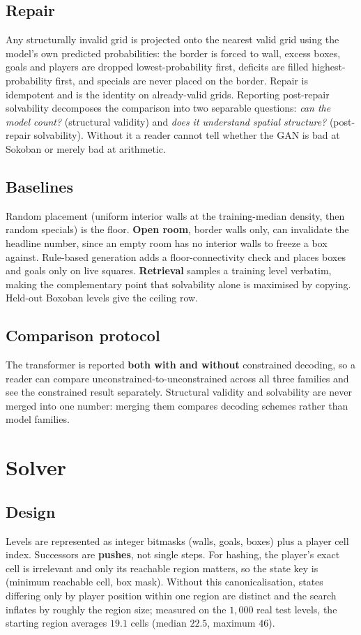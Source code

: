 \documentclass[conference]{IEEEtran}
\begin{document}
\subsection{Repair}
Any structurally invalid grid is projected onto the nearest valid grid using the
model's own predicted probabilities: the border is forced to wall, excess boxes,
goals and players are dropped lowest-probability first, deficits are filled
highest-probability first, and specials are never placed on the border. Repair is
idempotent and is the identity on already-valid grids. Reporting post-repair
solvability decomposes the comparison into two separable questions: \emph{can the
model count?} (structural validity) and \emph{does it understand spatial
structure?} (post-repair solvability). Without it a reader cannot tell whether
the GAN is bad at Sokoban or merely bad at arithmetic.

\subsection{Baselines}
Random placement (uniform interior walls at the training-median density, then
random specials) is the floor. \textbf{Open room}, border walls only, can
invalidate the headline number, since an empty room has no interior walls to
freeze a box against. Rule-based generation adds a floor-connectivity check and
places boxes and goals only on live squares. \textbf{Retrieval} samples a
training level verbatim, making the complementary point that solvability alone is
maximised by copying. Held-out Boxoban levels give the ceiling row.

\subsection{Comparison protocol}
The transformer is reported \textbf{both with and without} constrained decoding,
so a reader can compare unconstrained-to-unconstrained across all three
families and see the constrained result separately. Structural validity and
solvability are never merged into one number: merging them compares decoding
schemes rather than model families.

\section{Solver}
\label{sec:solver}

\subsection{Design}
Levels are represented as integer bitmasks (walls, goals, boxes) plus a player
cell index. Successors are \textbf{pushes}, not single steps. For hashing, the
player's exact cell is irrelevant and only its reachable region matters, so
the state key is (minimum reachable cell, box mask). Without this
canonicalisation, states differing only by player position within one region are
distinct and the search inflates by roughly the region size; measured on the
$1{,}000$ real test levels, the starting region averages $19.1$ cells (median
$22.5$, maximum $46$).
\end{document}
